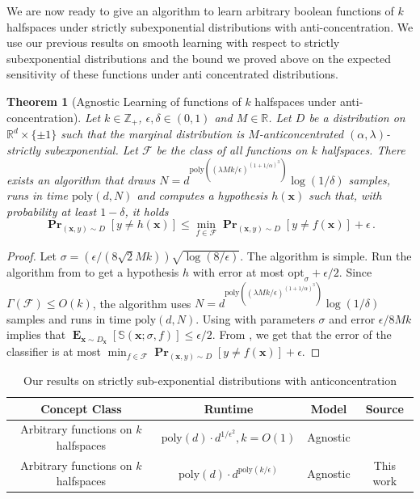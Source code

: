 \documentclass[10pt,a4paper]{article}
\newtheorem{theorem}{Theorem}[section]
\renewcommand\vec[1]{\mathbf{#1}}
\DeclareMathOperator*{\pr}{\mathbf{Pr}}
\DeclareMathOperator*{\E}{\mathbf{E}}
\newcommand{\R}{\mathbb{R}}
\newcommand{\poly}{\mathrm{poly}}
\newcommand{\1}{\Ind}
\newcommand{\smoothopt}{\mathrm{opt}_{\sigma}}
\newcommand{\x}{\vec x}
\newcommand{\F}{\mathcal{F}}
\begin{document}
We are now ready to give an algorithm to learn arbitrary boolean functions of $k$ halfspaces under strictly subexponential distributions with anti-concentration. We use our previous results on smooth learning with respect to strictly subexponential distributions and the bound we proved above on the expected sensitivity of these functions under anti concentrated distributions.
\begin{theorem}[Agnostic Learning of functions of $k$ halfspaces under anti-concentration]
\label{corollary: agnostic_subexp_functions_halfspaces}
Let $k\in \mathbb{Z}_{+}$, $\epsilon,\delta\in (0,1)$ and $M\in \R$. Let $D$ be a distribution on $\R^{d}\times \{\pm 1\}$ such that the marginal distribution is  $M$-anticoncentrated $(\alpha,\lambda)$-strictly subexponential. Let $\F$ be the class of all functions on $k$ halfspaces. There exists an algorithm that draws $N=d^{\poly((\lambda Mk/\epsilon)^{(1+1/\alpha)^3})}\log(1/\delta)$ samples, runs in time $\poly(d,N)$ and computes a hypothesis $h(\x)$ such that, with probability at least $1-\delta$, it holds
\[
    \pr_{(\x,y)\sim D}[y\neq h(\x)]\leq \min_{f\in \F}\pr_{(\x,y)\sim D}[y\neq f(\x)]+\epsilon\,.
\]
    
\end{theorem}
\begin{proof}
    Let $\sigma=(\epsilon/(8\sqrt{2}Mk))\sqrt{\log(8/\epsilon)}$. The algorithm is simple. Run the algorithm from  to get a hypothesis $h$ with error at most $\smoothopt+\epsilon/2$. Since $\Gamma(\F)\leq O(k)$, the algorithm uses $N=d^{\poly((\lambda Mk/\epsilon)^{(1+1/\alpha)^3})}\log(1/\delta)$ samples and runs in time $\poly(d,N)$. 
    Using  with parameters $\sigma$ and error $\epsilon/8Mk$ implies that $\E_{\x\sim D_\x}[\mathbb{S}(\x;\sigma,f)]\leq \epsilon/2$. From , we get that the error of the classifier is at most $\min_{f\in \F}\pr_{(\x,y)\sim D}[y\neq f(\x)]+\epsilon$.
\end{proof}



\begin{table}[ht]
\centering
\begin{tabular}{|c|c|c|c|}
\hline
Concept Class & Runtime & Model & Source \\
\hline
\hline
Arbitrary functions on $k$ halfspaces   & $\poly(d)\cdot d^{1/\epsilon^2},k=O(1)$ & Agnostic & \cite{gollakota_testable} \\
\hline
Arbitrary functions on $k$ halfspaces  & $\poly(d)\cdot d^{\poly(k/\epsilon)}$ & Agnostic & This work \\
\hline
\end{tabular}
\caption{Our results on strictly sub-exponential distributions with anticoncentration}
\label{tab:anticonc}
\end{table}
\end{document}
